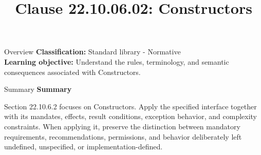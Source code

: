 \documentclass[10pt,letterpaper]{article}
\title{Clause 22.10.06.02: Constructors}
\author{}
\date{}
\begin{document}
\maketitle
\begin{CornellOverviewBox}{Overview}
\textbf{Classification:} Standard library - Normative\\[2pt]
\textbf{Learning objective:} Understand the rules, terminology, and semantic consequences associated with Constructors.
\end{CornellOverviewBox}\begin{CornellSummaryBox}{Summary}
{\sffamily\bfseries\color{Accent} Summary}\par\vspace{3pt}Section 22.10.6.2 focuses on Constructors. Apply the specified interface together with its mandates, effects, result conditions, exception behavior, and complexity constraints. When applying it, preserve the distinction between mandatory requirements, recommendations, permissions, and behavior deliberately left undefined, unspecified, or implementation-defined.
\end{CornellSummaryBox}
\end{document}
